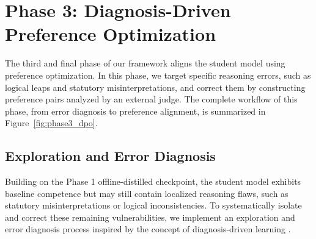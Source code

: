 \section{Phase 3: Diagnosis-Driven Preference Optimization}

The third and final phase of our framework aligns the student model using preference optimization. In this phase, we target specific reasoning errors, such as logical leaps and statutory misinterpretations, and correct them by constructing preference pairs analyzed by an external judge. The complete workflow of this phase, from error diagnosis to preference alignment, is summarized in Figure~\ref{fig:phase3_dpo}.



\subsection{Exploration and Error Diagnosis}

Building on the Phase 1 offline-distilled checkpoint, the student model exhibits baseline competence but may still contain localized reasoning flaws, such as statutory misinterpretations or logical inconsistencies. To systematically isolate and correct these remaining vulnerabilities, we implement an exploration and error diagnosis process inspired by the concept of diagnosis-driven learning \parencite{li2026legaldrilldiagnosisdrivensynthesislegal}.

